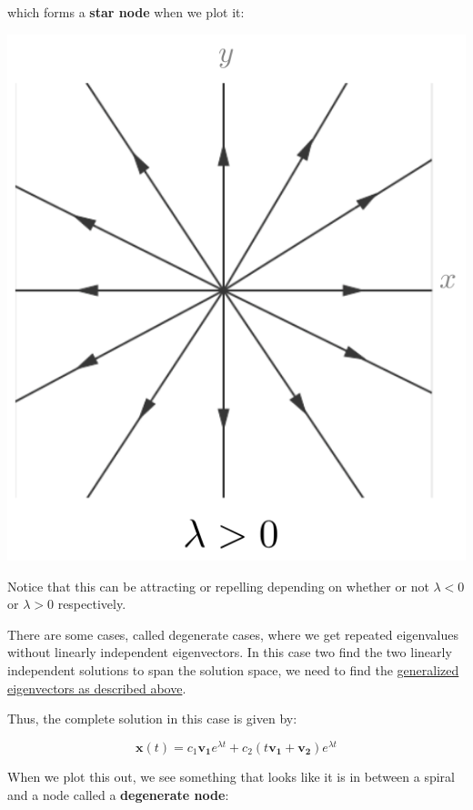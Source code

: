 \documentclass{report}
\begin{document}
which forms a \textbf{star node} when we plot it:

\includegraphics[scale=0.4]{star_node.png}

Notice that this can be attracting or repelling depending on whether or not $\lambda < 0$ or $\lambda > 0$ respectively.

There are some cases, called degenerate cases, where we get repeated eigenvalues without linearly independent eigenvectors. In this case two find the two linearly independent solutions to span the solution space, we need to find the \hyperref[th:repEig]{generalized eigenvectors as described above}.

Thus, the complete solution in this case is given by:

$$\mathbf{x}(t) = c_1\mathbf{v_1}e^{\lambda t} + c_2(t\mathbf{v_1} + \mathbf{v_2})e^{\lambda t}$$

When we plot this out, we see something that looks like it is in between a spiral and a node called a \textbf{degenerate node}:
\end{document}

